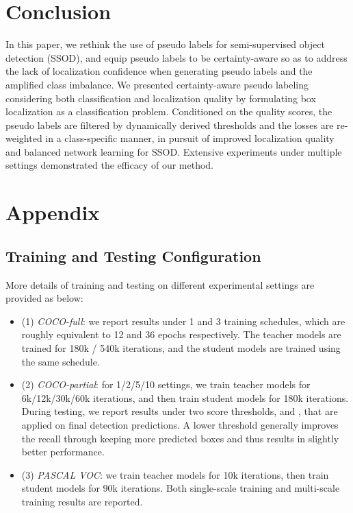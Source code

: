 \documentclass[letterpaper]{article} \usepackage{aaai22}  \usepackage{times}  \usepackage{helvet}  \usepackage{courier}  \usepackage[hyphens]{url}  \usepackage{graphicx} \urlstyle{rm} \def\UrlFont{\rm}  \usepackage{natbib}  \usepackage{caption} \DeclareCaptionStyle{ruled}{labelfont=normalfont,labelsep=colon,strut=off} \frenchspacing  \setlength{\pdfpagewidth}{8.5in}  \setlength{\pdfpageheight}{11in}  \usepackage{algorithm}
\begin{document}
\section{Conclusion}

In this paper, we rethink the use of pseudo labels for semi-supervised object detection (SSOD), and equip pseudo labels to be certainty-aware so as to address the lack of localization confidence when generating pseudo labels and the amplified class imbalance. We presented certainty-aware pseudo labeling considering both classification and localization quality by formulating box localization as a classification problem. Conditioned on the quality scores, the pseudo labels are filtered by dynamically derived thresholds and the losses are re-weighted in a class-specific manner, in pursuit of improved localization quality and balanced network learning for SSOD. Extensive experiments under multiple settings demonstrated the efficacy of our method. 

\section*{Appendix}

\subsection{Training and Testing Configuration} 

More details of training and testing on different experimental settings are provided as below: 
\begin{itemize}
    \item (1) \emph{COCO-full}: we report results under 1 and 3 training schedules, which are roughly equivalent to 12 and 36 epochs respectively. The teacher models are trained for 180k / 540k iterations, and the student models are trained using the same schedule.
    \item (2) \emph{COCO-partial}: for 1/2/5/10 settings, we train teacher models for 6k/12k/30k/60k iterations, and then train student models for 180k iterations. During testing, we report results under two score thresholds,  and , that are applied on final detection predictions. A lower threshold generally improves the recall through keeping more predicted boxes and thus results in slightly better performance.
    \item (3) \emph{PASCAL VOC}: we train teacher models for 10k iterations, then train student models for 90k iterations. Both single-scale training and multi-scale training results are reported. 
\end{itemize}
\end{document}
